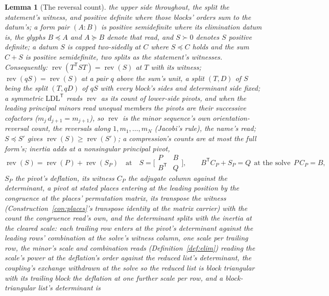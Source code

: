 \documentclass[11pt]{article}
\newtheorem{lemma}{Lemma}
\theoremstyle{definition}
\begin{document}
\begin{lemma}[The reversal count]
the upper side throughout, the split the statement's witness, and
\emph{positive definite} where those blocks' orders sum to the
datum's; a form pair $(A\!:\!B)$ is positive semidefinite where
its elimination datum is, the glyphs $B\preceq A$
and $A\succeq B$ denote that read, and $S\succ0$ denotes $S$
positive definite; a datum $S$ is \emph{capped
two-sidedly} at $C$ where $S\preceq C$ holds and the sum $C+S$ is
positive semidefinite, two splits as the statement's witnesses.
Consequently:
$\operatorname{rev}(T^{\mathsf T}ST)=\operatorname{rev}(S)$
at $T$ with its witness;
$\operatorname{rev}(qS)=\operatorname{rev}(S)$ at a pair $q$ above
the sum's unit, a
split $(T,D)$ of $S$ being the split $(T,qD)$ of $qS$ with every
block's sides and determinant side fixed; a symmetric $\mathrm{LDL}^{\mathsf T}$ reads
$\operatorname{rev}$ as its count of lower-side pivots, and when
the leading principal minors read unequal members the pivots are
their successive cofactors ($m_j\,d_{j+1}=m_{j+1}$), so $\operatorname{rev}$ is the minor
sequence's own orientation-reversal count, the reversals along
$1,m_1,\dots,m_N$ (Jacobi's rule), the name's read;
$S\preceq S'$ gives
$\operatorname{rev}(S)\ge\operatorname{rev}(S')$; a
compression's counts are at most the full form's; inertia adds at a
nonsingular principal pivot,
\[
\operatorname{rev}(S)=\operatorname{rev}(P)
+\operatorname{rev}(S_P)
\quad\text{at}\quad
S=\Big[\begin{smallmatrix}P&B\\B^{\mathsf T}&Q\end{smallmatrix}\Big],
\qquad
B^{\mathsf T}C_P+S_P=Q\ \ \text{at the solve}\ \ P\,C_P=B ,
\]
$S_P$ the pivot's \emph{deflation}, its witness $C_P$ the
adjugate column against the determinant, a pivot at stated places
entering at the leading position by the congruence at the places'
permutation matrix, its transpose the witness
(Construction~\ref{con:places}'s transpose identity at the matrix
carrier) with the count the congruence read's own, and the determinant
splits with the inertia at the cleared scale: each trailing row
enters at the pivot's determinant against the leading rows'
combination at the solve's witness column, one scale per trailing
row, the minor's scale and combination reads
(Definition~\ref{def:elim}) reading the scale's power at the
deflation's order against the reduced list's determinant, the
coupling's exchange withdrawn at the solve so the reduced list is
block triangular with its trailing block the deflation at one
further scale per row, and a block-triangular list's determinant is

\end{lemma}
\end{document}
